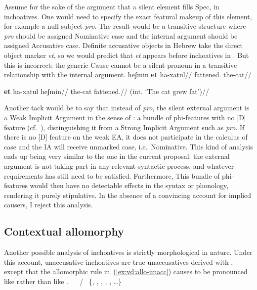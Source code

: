 Assume for the sake of the argument that a silent element fills Spec,{\vd} in inchoatives. One would need to specify the exact featural makeup of this element, for example a null subject \emph{pro}. The result would be a transitive structure where \emph{pro} should be assigned Nominative case and the internal argument should be assigned Accusative case. Definite accusative objects in Hebrew take the direct object marker \emph{et}, so we would predict that \emph{et} appears before inchoatives in \thif. But this is incorrect: the generic Cause cannot be a silent pronoun in a transitive relationship with the internal argument.
\pex
	\a \ljudge{*} \begingl
		\gla heʃmin \textbf{et} ha-xatul//
		\glb fattened.  the-cat//
	\endgl
	
	\a \ljudge{*} \begingl
		\gla \textbf{et} ha-xatul heʃmin//
		\glb {} the-cat fattened.//
		\glft (int. `The cat grew fat')//
	\endgl
\xe

Another tack would be to say that instead of \emph{pro}, the silent external argument is a Weak Implicit Argument in the sense of \cite{landau10}: a bundle of phi-features with no [D] feature (cf.~\citealt{legate14,bhattpancheva17}), distinguishing it from a Strong Implicit Argument such as \emph{pro}. If there is no [D] feature on the weak EA, it does not participate in the calculus of case and the IA will receive unmarked case, i.e.~Nominative. This kind of analysis ends up being very similar to the one in the current proposal: the external argument is not taking part in any relevant syntactic process, and whatever requirements {\vd} has still need to be satisfied. Furthermore, This bundle of phi-features would then have no detectable effects in the syntax or phonology, rendering it purely stipulative. In the absence of a convincing account for implied causers, I reject this analysis.

	\subsection{Contextual allomorphy}
Another possible analysis of inchoatives is strictly morphological in nature. Under this account, unaccusative inchoatives are true unaccusatives derived with {\vz}, except that the allomorphic rule in~(\ref{ex:vd:allo-unacc}) causes {\vz} to be pronounced like {\thif} rather than like {\tnif}.
\pex
  \a \vz~\lra~{\thif} / \trace~\{, , , , , \dots \}\label{ex:vd:allo-unacc}
  \a \vz~\lra~{\tnif}
\xe

